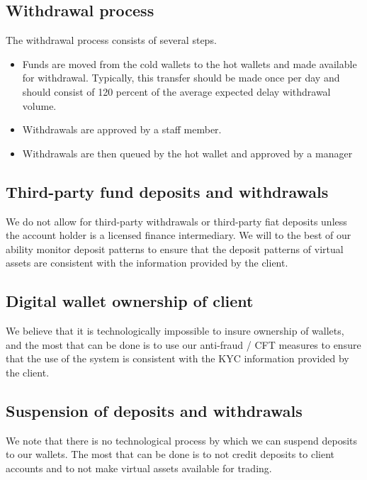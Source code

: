 \subsection{Withdrawal process}
The withdrawal process consists of several steps.
\begin{itemize}
  \item Funds are moved from the cold wallets to the hot wallets and
    made available for withdrawal.  Typically, this transfer should be
    made once per day and should consist of 120 percent of the average
    expected delay withdrawal volume.
  \item Withdrawals are approved by a staff member.
  \item Withdrawals are then queued by the hot wallet and approved by a manager
\end{itemize}

\subsection{Third-party fund deposits and withdrawals}
We do not allow for third-party withdrawals or third-party fiat
deposits unless the account holder is a licensed finance intermediary.
We will to the best of our ability monitor deposit patterns to ensure
that the deposit patterns of virtual assets are consistent with the
information provided by the client.

\subsection{Digital wallet ownership of client}
We believe that it is technologically impossible to insure ownership
of wallets, and the most that can be done is to use our anti-fraud /
CFT measures to ensure that the use of the system is consistent with
the KYC information provided by the client.

\subsection{Suspension of deposits and withdrawals}
We note that there is no technological process by which we can suspend
deposits to our wallets.  The most that can be done is to not
credit deposits to client accounts and to not make virtual assets
available for trading.

